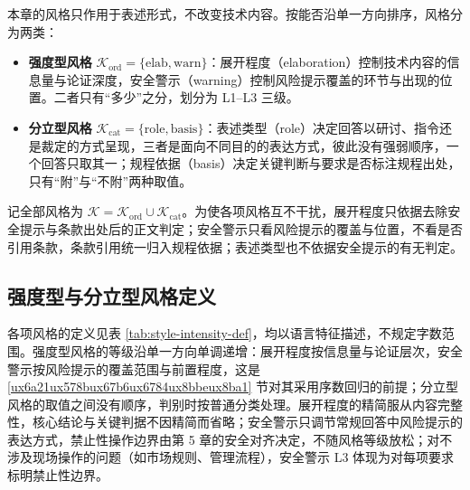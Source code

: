 \documentclass[fontset=fandol,type=master,campus=shenzhen,etitleauto=true]{hithesisbook}
\providecommand{\tightlist}{%
  \setlength{\itemsep}{0pt}\setlength{\parskip}{0pt}}
\begin{document}
本章的风格只作用于表述形式，不改变技术内容。按能否沿单一方向排序，风格分为两类：
\begin{itemize}
\tightlist
\item \textbf{强度型风格} $\mathcal{K}_{\text{ord}} = \{\text{elab}, \text{warn}\}$：展开程度（elaboration）控制技术内容的信息量与论证深度，安全警示（warning）控制风险提示覆盖的环节与出现的位置。二者只有“多少”之分，划分为 L1--L3 三级。
\item \textbf{分立型风格} $\mathcal{K}_{\text{cat}} = \{\text{role}, \text{basis}\}$：表述类型（role）决定回答以研讨、指令还是裁定的方式呈现，三者是面向不同目的的表达方式，彼此没有强弱顺序，一个回答只取其一；规程依据（basis）决定关键判断与要求是否标注规程出处，只有“附”与“不附”两种取值。
\end{itemize}
记全部风格为 $\mathcal{K} = \mathcal{K}_{\text{ord}} \cup \mathcal{K}_{\text{cat}}$。为使各项风格互不干扰，展开程度只依据去除安全提示与条款出处后的正文判定；安全警示只看风险提示的覆盖与位置，不看是否引用条款，条款引用统一归入规程依据；表述类型也不依据安全提示的有无判定。

\subsection{强度型与分立型风格定义}\label{ux98ceux683cux5f3aux5ea6ux7b49ux7ea7ux5212ux5206}

各项风格的定义见表 \ref{tab:style-intensity-def}，均以语言特征描述，不规定字数范围。强度型风格的等级沿单一方向单调递增：展开程度按信息量与论证层次，安全警示按风险提示的覆盖范围与前置程度，这是 \ref{ux6a21ux578bux67b6ux6784ux8bbeux8ba1} 节对其采用序数回归的前提；分立型风格的取值之间没有顺序，判别时按普通分类处理。展开程度的精简服从内容完整性，核心结论与关键判据不因精简而省略；安全警示只调节常规回答中风险提示的表达方式，禁止性操作边界由第 5 章的安全对齐决定，不随风格等级放松；对不涉及现场操作的问题（如市场规则、管理流程），安全警示 L3 体现为对每项要求标明禁止性边界。
\end{document}
